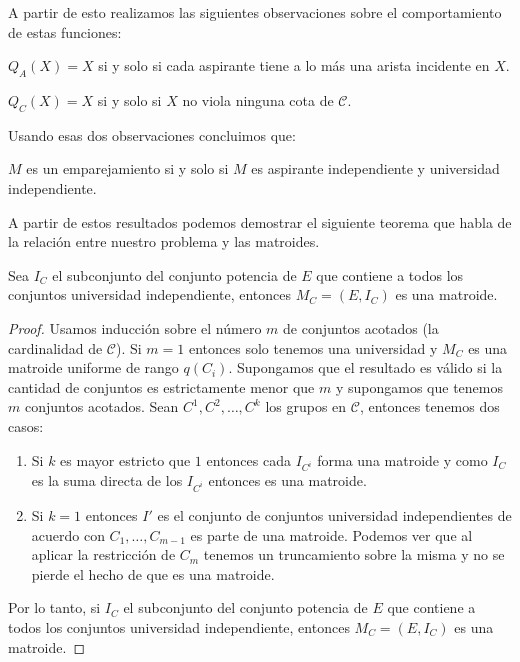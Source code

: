 A partir de esto realizamos las siguientes observaciones sobre el comportamiento de estas funciones:

\begin{obs}
$Q_A(X)=X$ si y solo si cada aspirante tiene a lo más una arista incidente en $X$.
\end{obs}
\begin{obs}
$Q_C(X)=X$ si y solo si $X$ no viola ninguna cota de $\mathcal{C}$.
\end{obs}

Usando esas dos observaciones concluimos que:

\begin{obs}
$M$ es un emparejamiento si y solo si $M$ es aspirante independiente y universidad independiente. 
\end{obs}

A partir de estos resultados podemos demostrar el siguiente teorema que habla de la relación entre nuestro problema y las matroides. 

\begin{teo}
\label{matroid}
Sea $I_C$ el subconjunto del conjunto potencia de $E$ que contiene a todos los conjuntos universidad independiente, entonces $M_C = (E,I_C)$ es una matroide. 
\end{teo}

\begin{proof}
Usamos inducción sobre el número $m$ de conjuntos acotados (la cardinalidad de $\mathcal{C}$). Si $m=1$ entonces solo tenemos una universidad y $M_C$ es una matroide uniforme de rango $q(C_i)$. 
Supongamos que el resultado es válido si la cantidad de conjuntos es estrictamente menor que $m$ y supongamos que tenemos $m$ conjuntos acotados. Sean $C^1,C^2,\dots, C^k$ los grupos en $\mathcal{C}$, entonces tenemos dos casos:
\begin{enumerate}
\item Si $k$ es mayor estricto que $1$ entonces cada $I_{C^i}$ forma una matroide y como $I_C$ es la suma directa de los $I_{C^i}$ entonces es una matroide. 
\item Si $k=1$ entonces $I'$ es el conjunto de conjuntos universidad independientes de acuerdo con $C_1,\dots,C_{m-1}$ es parte de una matroide. Podemos ver que al aplicar la restricción de $C_m$ tenemos un truncamiento sobre la misma y no se pierde el hecho de que es una matroide. 
\end{enumerate}
Por lo tanto, si $I_C$ el subconjunto del conjunto potencia de $E$ que contiene a todos los conjuntos universidad independiente, entonces $M_C = (E,I_C)$ es una matroide.
\end{proof}

